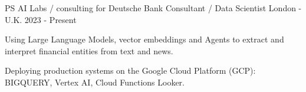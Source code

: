 


\begin{cventries}





\cventry
{PS AI Labs / consulting for Deutsche Bank} %
{Consultant / Data Scientist} %
{London - U.K.} %
{2023 - Present} %
{ %
\begin{cvitems}
\item {Using Large Language Models, vector embeddings and Agents to extract and interpret financial entities from text and news.}
\item {Deploying production systems on the Google Cloud Platform (GCP): BIGQUERY, Vertex AI, Cloud Functions Looker.}
\end{cvitems}
}


\end{cventries}
